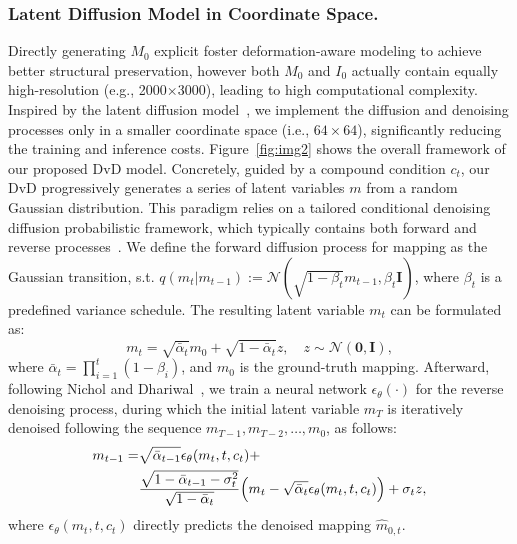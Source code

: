 \subsubsection{Latent Diffusion Model in Coordinate Space.}
Directly generating $M_0$ explicit foster deformation-aware modeling to achieve better structural preservation, however both $M_0$ and $I_0$ actually contain equally high-resolution (e.g., 2000×3000), leading to high computational complexity. Inspired by the latent diffusion model~\cite{rombach2021highresolution}, we implement the diffusion and denoising processes only in a smaller coordinate space (i.e., $64\times64$), significantly reducing the training and inference costs. Figure~\ref{fig:img2} shows the overall framework of our proposed DvD model. Concretely, guided by a compound condition $c_t$, our DvD progressively generates a series of latent variables $m$ from a random Gaussian distribution. This paradigm relies on a tailored conditional denoising diffusion probabilistic framework, which typically contains both forward and reverse processes~\cite{ho_2020_ddpm, Song_2019_Generative}. We define the forward diffusion process for mapping as the Gaussian transition, s.t. $q(m_{t} | m_{t-1}) :=\mathcal{N}(\sqrt{1-\beta_t}m_{t-1}, \beta_t \mathbf{I})$, where ${\beta_t}$ is a predefined variance schedule. The resulting latent variable $m_t$ can be formulated as:
\begin{equation}
\label{eq:forward}
m_t = \sqrt{\bar{\alpha}_t}m_0 + \sqrt{1 - \bar{\alpha}_t}z, \quad z \sim \mathcal{N}(\mathbf{0},\mathbf{I}),
\end{equation}
where $\bar{\alpha}_t=\prod_{i=1}^t\left(1-\beta_i\right)$, and $m_{0}$ is the ground-truth mapping. 
Afterward, following Nichol and Dhariwal~\citeyearpar{Alexander_2020_ddim}, we train a neural network $\mathcal{\epsilon}_{\theta}(\cdot)$ for the reverse denoising process, during which the initial latent variable ${m}_{T}$ is iteratively denoised following the sequence ${m}_{T-1}, {m}_{T-2}, \ldots, {m}_{0}$, as follows:
\begin{equation}
\begin{split}
\label{eq:reverse_ddim}
m_{t-1} = &\sqrt{\bar{\alpha}_{t-1}}\mathcal{\epsilon}_{\theta}(m_t, t, c_t) +\\
&\frac{\sqrt{1-\bar{\alpha}_{t-1}-\sigma_t^2}}{\sqrt{1-\bar{\alpha}_{t}}}\Bigl(m_{t} - 
\sqrt{\bar{\alpha}_{t}}\mathcal{\epsilon}_{\theta}(m_t, t,c_t)\Bigr) + \sigma_{t}z,
\end{split}
\end{equation}
where $\mathcal{\epsilon}_{\theta}(m_t, t, c_t)$ directly predicts the denoised mapping $\hat{m}_{0,t}$.

